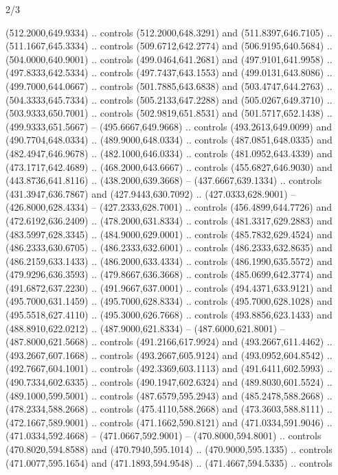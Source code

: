 \begin{flagdescription}{2/3}
\begin{scope}[xshift=0.5\flaglength,yshift=0.5\flagwidth,scale=\flagwidth/525.28]
\begin{scope}[y=0.1mm, x=0.1mm, yscale=-1,shift={(-381.5,-404)}]
\begin{scope}[shift={(5.25001,4.53053)},miter limit=4.00,line width=0.800\lw]
  (512.2000,649.9334) .. controls (512.2000,648.3291) and (511.8397,646.7105) ..
  (511.1667,645.3334) .. controls (509.6712,642.2774) and (506.9195,640.5684) ..
  (504.0000,640.9001) .. controls (499.0464,641.2681) and (497.9101,641.9958) ..
  (497.8333,642.5334) .. controls (497.7437,643.1553) and (499.0131,643.8086) ..
  (499.7000,644.0667) .. controls (501.7885,643.6838) and (503.4747,644.2763) ..
  (504.3333,645.7334) .. controls (505.2133,647.2288) and (505.0267,649.3710) ..
  (503.9333,650.7001) .. controls (502.9819,651.8531) and (501.5717,652.1438) ..
  (499.9333,651.5667) -- (495.6667,649.9668) .. controls (493.2613,649.0099) and
  (490.7704,648.0334) .. (489.9000,648.0334) .. controls (487.0851,648.0335) and
  (482.4947,646.9678) .. (482.1000,646.0334) .. controls (481.0952,643.4339) and
  (473.1717,642.4689) .. (468.2000,643.6667) .. controls (455.6827,646.9030) and
  (443.8736,641.8116) .. (438.2000,639.3668) -- (437.6667,639.1334) .. controls
  (431.3947,636.7867) and (427.9443,630.7092) .. (427.0333,628.9001) --
  (426.8000,628.4334) -- (427.2333,628.7001) .. controls (456.4899,644.7726) and
  (472.6192,636.2409) .. (478.2000,631.8334) .. controls (481.3317,629.2883) and
  (483.5997,628.3345) .. (484.9000,629.0001) .. controls (485.7832,629.4524) and
  (486.2333,630.6705) .. (486.2333,632.6001) .. controls (486.2333,632.8635) and
  (486.2159,633.1433) .. (486.2000,633.4334) .. controls (486.1990,635.5572) and
  (479.9296,636.3593) .. (479.8667,636.3668) .. controls (485.0699,642.3774) and
  (491.6872,637.2230) .. (491.9667,637.0001) .. controls (494.4371,633.9121) and
  (495.7000,631.1459) .. (495.7000,628.8334) .. controls (495.7000,628.1028) and
  (495.5518,627.4110) .. (495.3000,626.7668) .. controls (493.8856,623.1433) and
  (488.8910,622.0212) .. (487.9000,621.8334) -- (487.6000,621.8001) --
  (487.8000,621.5668) .. controls (491.2166,617.9924) and (493.2667,611.4462) ..
  (493.2667,607.1668) .. controls (493.2667,605.9124) and (493.0952,604.8542) ..
  (492.7667,604.1001) .. controls (492.3369,603.1113) and (491.6411,602.5993) ..
  (490.7334,602.6335) .. controls (490.1947,602.6324) and (489.8030,601.5524) ..
  (489.1000,599.5001) .. controls (487.6579,595.2943) and (485.2478,588.2668) ..
  (478.2334,588.2668) .. controls (475.4110,588.2668) and (473.3603,588.8111) ..
  (472.1667,589.9001) .. controls (471.1662,590.8121) and (471.0334,591.9046) ..
  (471.0334,592.4668) -- (471.0667,592.9001) -- (470.8000,594.8001) .. controls
  (470.8020,594.8588) and (470.7940,595.1014) .. (470.9000,595.1335) .. controls
  (471.0077,595.1654) and (471.1893,594.9548) .. (471.4667,594.5335) .. controls

\end{scope}
\end{scope}
\end{scope}
\end{flagdescription}
